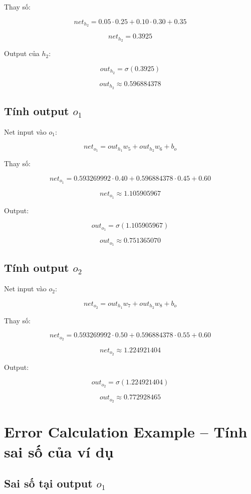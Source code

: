 Thay số:

\[
    net_{h_2}
    =
    0.05\cdot 0.25
    +
    0.10\cdot 0.30
    +
    0.35
\]

\[
    net_{h_2}=0.3925
\]

Output của $h_2$:

\[
    out_{h_2}=\sigma(0.3925)
\]

\[
    out_{h_2}\approx 0.596884378
\]

\subsection{Tính output $o_1$}

Net input vào $o_1$:

\[
    net_{o_1}=out_{h_1}w_5+out_{h_2}w_6+b_o
\]

Thay số:

\[
    net_{o_1}
    =
    0.593269992\cdot 0.40
    +
    0.596884378\cdot 0.45
    +
    0.60
\]

\[
    net_{o_1}\approx 1.105905967
\]

Output:

\[
    out_{o_1}=\sigma(1.105905967)
\]

\[
    out_{o_1}\approx 0.751365070
\]

\subsection{Tính output $o_2$}

Net input vào $o_2$:

\[
    net_{o_2}=out_{h_1}w_7+out_{h_2}w_8+b_o
\]

Thay số:

\[
    net_{o_2}
    =
    0.593269992\cdot 0.50
    +
    0.596884378\cdot 0.55
    +
    0.60
\]

\[
    net_{o_2}\approx 1.224921404
\]

Output:

\[
    out_{o_2}=\sigma(1.224921404)
\]

\[
    out_{o_2}\approx 0.772928465
\]

\section{Error Calculation Example -- Tính sai số của ví dụ}

\subsection{Sai số tại output $o_1$}

